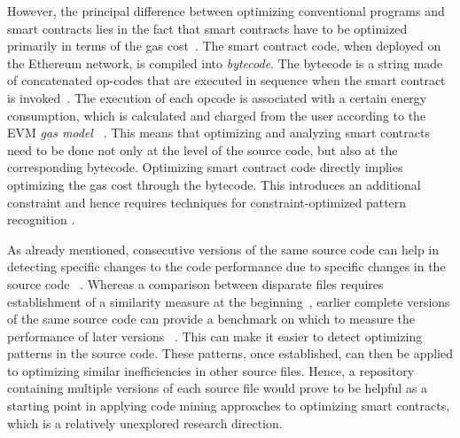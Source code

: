\documentclass[10pt,conference]{IEEEtran}
\begin{document}
	However, the principal difference between optimizing conventional programs and smart contracts lies in the fact that smart contracts have to be optimized primarily in terms of the gas cost~\cite{superoptimization}. The smart contract code, when deployed on the Ethereum network, is compiled into \textit{bytecode}. The bytecode is a string made of concatenated op-codes that are executed in sequence when the smart contract is invoked~\cite{wood2019ethereum}. The execution of each opcode is associated with a certain energy consumption, which is calculated and charged from the user according to the EVM \textit{gas model} ~\cite{wood2019ethereum}. This means that optimizing and analyzing smart contracts need to be done not only at the level of the source code, but also at the corresponding bytecode. Optimizing smart contract code directly implies optimizing the gas cost through the bytecode. This introduces an additional constraint and hence requires techniques for constraint-optimized pattern recognition \cite{utilitypattern}.
	
	As already mentioned, consecutive versions of the same source code can help in detecting specific changes to the code performance due to specific changes in the source code ~\cite{softwareversion}. Whereas a comparison between disparate files requires establishment of a similarity measure at the beginning~\cite{simsimilarity}, earlier complete versions of the same source code can provide a benchmark on which to measure the performance of later versions ~\cite{softwareversion}. This can make it easier to detect optimizing patterns in the source code. These patterns, once established, can then be applied to optimizing similar inefficiencies in other source files. Hence, a repository containing multiple versions of each source file would prove to be helpful as a starting point in applying code mining approaches to optimizing smart contracts, which is a relatively unexplored research direction.
	
\end{document}
